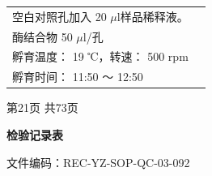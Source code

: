 \documentclass[UTF8,10pt,a4paper,fontset=fandol]{ctexart}
\newcommand{\fieldvalue}[1]{#1}
\newcommand{\handwritten}[1]{#1}
\begin{document}
\begin{tabularx}{\textwidth}{|p{}|X|}
空白对照孔加入
\fieldvalue{\handwritten{20}} $\mu$l样品稀释液。\\
酶结合物
\fieldvalue{\handwritten{50}} $\mu$l/孔\\
孵育温度：
\fieldvalue{\handwritten{19}} ℃，转速：
\fieldvalue{\handwritten{500}} rpm\\
孵育时间：
\fieldvalue{\handwritten{11:50}} ～ 
\fieldvalue{\handwritten{12:50}}\\
\hline
\end{tabularx}

\begin{center}
\small 第21页 共73页
\end{center}

\newpage

\begin{center}
\textbf{检验记录表}
\end{center}

\noindent
文件编码：REC-YZ-SOP-QC-03-092
\end{document}
